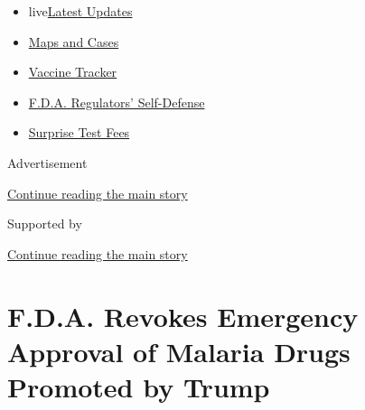 \begin{itemize}
\tightlist
\item
  live\href{https://www.nytimes3xbfgragh.onion/2020/09/12/world/covid-19-coronavirus.html?name=styln-coronavirus-national\&region=TOP_BANNER\&block=storyline_menu_recirc\&action=click\&pgtype=Article\&impression_id=f2208660-f52e-11ea-9322-a3eb5bc47b4b\&variant=undefined}{Latest
  Updates}
\item
  \href{https://www.nytimes3xbfgragh.onion/interactive/2020/us/coronavirus-us-cases.html?name=styln-coronavirus-national\&region=TOP_BANNER\&block=storyline_menu_recirc\&action=click\&pgtype=Article\&impression_id=f2208661-f52e-11ea-9322-a3eb5bc47b4b\&variant=undefined}{Maps
  and Cases}
\item
  \href{https://www.nytimes3xbfgragh.onion/interactive/2020/science/coronavirus-vaccine-tracker.html?name=styln-coronavirus-national\&region=TOP_BANNER\&block=storyline_menu_recirc\&action=click\&pgtype=Article\&impression_id=f2208662-f52e-11ea-9322-a3eb5bc47b4b\&variant=undefined}{Vaccine
  Tracker}
\item
  \href{https://www.nytimes3xbfgragh.onion/2020/09/10/us/politics/fda-coronavirus-vaccine.html?name=styln-coronavirus-national\&region=TOP_BANNER\&block=storyline_menu_recirc\&action=click\&pgtype=Article\&impression_id=f220ad70-f52e-11ea-9322-a3eb5bc47b4b\&variant=undefined}{F.D.A.
  Regulators' Self-Defense}
\item
  \href{https://www.nytimes3xbfgragh.onion/2020/09/09/upshot/coronavirus-surprise-test-fees.html?name=styln-coronavirus-national\&region=TOP_BANNER\&block=storyline_menu_recirc\&action=click\&pgtype=Article\&impression_id=f220ad71-f52e-11ea-9322-a3eb5bc47b4b\&variant=undefined}{Surprise
  Test Fees}
\end{itemize}

Advertisement

\protect\hyperlink{after-top}{Continue reading the main story}

Supported by

\protect\hyperlink{after-sponsor}{Continue reading the main story}

\hypertarget{fda-revokes-emergency-approval-of-malaria-drugs-promoted-by-trump}{%
\section{F.D.A. Revokes Emergency Approval of Malaria Drugs Promoted by
Trump}\label{fda-revokes-emergency-approval-of-malaria-drugs-promoted-by-trump}}

